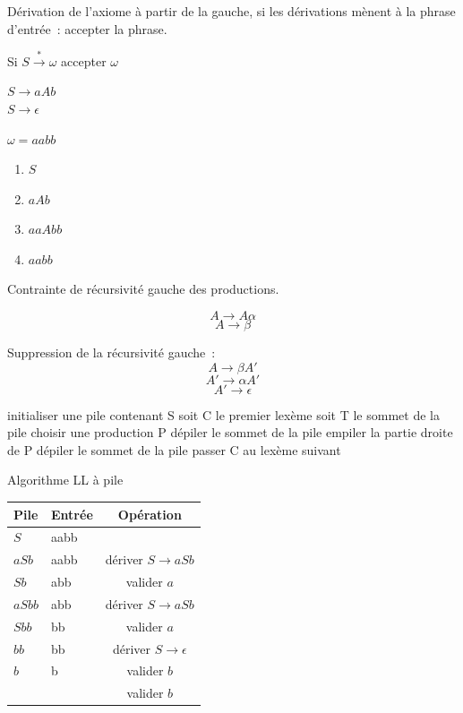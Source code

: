 \documentclass{beamer}
\begin{document}
\begin{frame}
 Dérivation de l'axiome à partir de la gauche, si les dérivations mènent à la phrase d'entrée~: accepter la phrase.

 Si $S \xrightarrow{*} \omega$ accepter $\omega$

 \begin{center}
  $S \rightarrow aAb$ \\
  $S \rightarrow \epsilon$ \\
 \end{center}

 $\omega = aabb$
 \begin{enumerate}
  \item $S$
  \item $aAb$
  \item $aaAbb$
  \item $aabb$
 \end{enumerate}
\end{frame}

\begin{frame}
	Contrainte de récursivité gauche des productions.

	$$ A \rightarrow A\alpha $$ 
	$$ A \rightarrow \beta $$

	Suppression de la récursivité gauche~:
	$$ A \rightarrow \beta A' $$
	$$ A' \rightarrow \alpha A' $$
	$$ A' \rightarrow \epsilon $$

\end{frame}

\begin{frame}
\begin{algorithm}[H]
 initialiser une pile contenant S\;
 soit C le premier lexème\;
  {
  soit T le sommet de la pile\;
   {
		choisir une production P\;
		dépiler le sommet de la pile\;
		empiler la partie droite de P\;
   }{
    {
			dépiler le sommet de la pile\;
			passer C au lexème suivant\;
		}
	 }
 }
 \caption{Algorithme LL à pile}
\end{algorithm}
\end{frame}

\begin{frame}
	\begin{center}
		\begin{tabular}{|l|l|c|}
			\hline
			Pile & Entrée & Opération \\
			\hline
			$S$ & aabb & \\
			$aSb$ & aabb & dériver $S \rightarrow aSb$ \\
			$Sb$ & abb & valider $a$ \\
			$aSbb$ & abb & dériver $S \rightarrow aSb$ \\
			$Sbb$ & bb & valider $a$ \\
			$bb$ & bb & dériver $S \rightarrow \epsilon$ \\
			$b$ & b & valider $b$ \\
			& & valider $b$ \\
			\hline
		\end{tabular}
	\end{center}
\end{frame}
\end{document}
